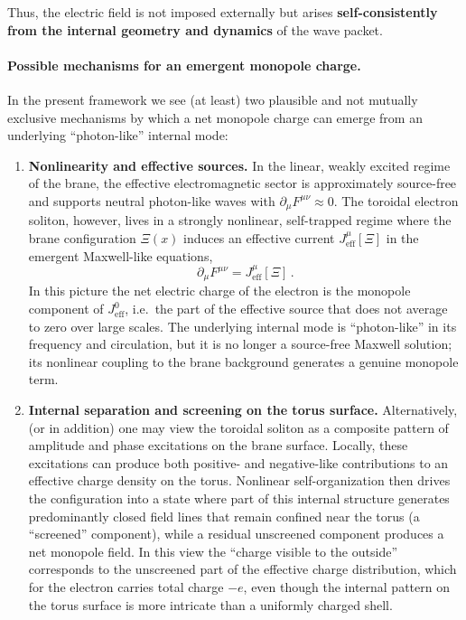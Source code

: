 Thus, the electric field is not imposed externally but arises
\textbf{self-consistently from the internal geometry and dynamics} of
the wave packet.

\paragraph{Possible mechanisms for an emergent monopole charge.}

In the present framework we see (at least) two plausible and not
mutually exclusive mechanisms by which a net monopole charge can
emerge from an underlying ``photon-like'' internal mode:

\begin{enumerate}
\item \textbf{Nonlinearity and effective sources.}
In the linear, weakly excited regime of the brane, the effective
electromagnetic sector is approximately source-free and supports
neutral photon-like waves with $\partial_\mu F^{\mu\nu} \approx 0$.
The toroidal electron soliton, however, lives in a strongly nonlinear,
self-trapped regime where the brane configuration $\Xi(x)$ induces an
effective current $J^\mu_{\mathrm{eff}}[\Xi]$ in the emergent
Maxwell-like equations,
\[
  \partial_\mu F^{\mu\nu} = J^\mu_{\mathrm{eff}}[\Xi] \, .
\]
In this picture the net electric charge of the electron is the
monopole component of $J^0_{\mathrm{eff}}$, i.e.\ the part of the
effective source that does not average to zero over large scales.
The underlying internal mode is ``photon-like'' in its frequency and
circulation, but it is no longer a source-free Maxwell solution; its
nonlinear coupling to the brane background generates a genuine
monopole term.

\item \textbf{Internal separation and screening on the torus surface.}
Alternatively, (or in addition) one may view the toroidal soliton as a
composite pattern of amplitude and phase excitations on the brane
surface. Locally, these excitations can produce both positive- and
negative-like contributions to an effective charge density on the
torus. Nonlinear self-organization then drives the configuration into
a state where part of this internal structure generates predominantly
closed field lines that remain confined near the torus (a
``screened'' component), while a residual unscreened component
produces a net monopole field. In this view the ``charge visible to
the outside'' corresponds to the unscreened part of the effective
charge distribution, which for the electron carries total charge
$-e$, even though the internal pattern on the torus surface is more
intricate than a uniformly charged shell.
\end{enumerate}

